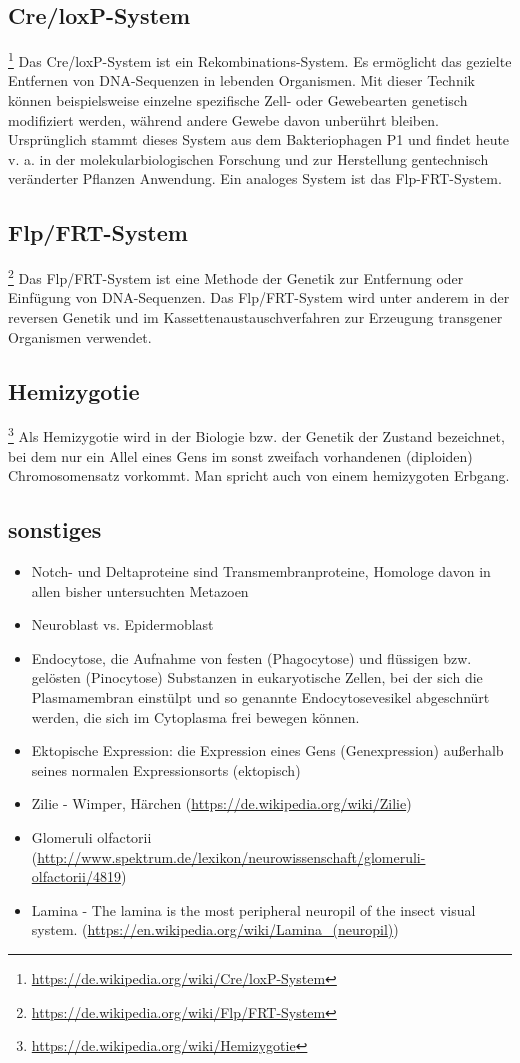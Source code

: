 \subsection{Cre/loxP-System}\footnote{\url{https://de.wikipedia.org/wiki/Cre/loxP-System}}
Das Cre/loxP-System ist ein Rekombinations-System. Es ermöglicht das gezielte Entfernen von DNA-Sequenzen in lebenden Organismen. Mit dieser Technik können beispielsweise einzelne spezifische Zell- oder Gewebearten genetisch modifiziert werden, während andere Gewebe davon unberührt bleiben. Ursprünglich stammt dieses System aus dem Bakteriophagen P1 und findet heute v. a. in der molekularbiologischen Forschung und zur Herstellung gentechnisch veränderter Pflanzen Anwendung. Ein analoges System ist das Flp-FRT-System.

\subsection{Flp/FRT-System}\footnote{\url{https://de.wikipedia.org/wiki/Flp/FRT-System}}
Das Flp/FRT-System ist eine Methode der Genetik zur Entfernung oder Einfügung von DNA-Sequenzen. Das Flp/FRT-System wird unter anderem in der reversen Genetik und im Kassettenaustauschverfahren zur Erzeugung transgener Organismen verwendet.

\subsection{Hemizygotie}\footnote{\url{https://de.wikipedia.org/wiki/Hemizygotie}}
Als Hemizygotie wird in der Biologie bzw. der Genetik der Zustand bezeichnet, bei dem nur ein Allel eines Gens im sonst zweifach vorhandenen (diploiden) Chromosomensatz vorkommt. Man spricht auch von einem hemizygoten Erbgang.

\subsection{sonstiges}
\begin{itemize}
	\item Notch- und Deltaproteine sind Transmembranproteine, Homologe davon in allen bisher untersuchten Metazoen 
	\item Neuroblast vs. Epidermoblast
	\item Endocytose, die Aufnahme von festen (Phagocytose) und flüssigen bzw. gelösten (Pinocytose) Substanzen in eukaryotische Zellen, bei der sich die Plasmamembran einstülpt und so genannte Endocytosevesikel abgeschnürt werden, die sich im Cytoplasma frei bewegen können.
	\item Ektopische Expression: die Expression eines Gens (Genexpression) außerhalb seines normalen Expressionsorts (ektopisch)
	\item Zilie - Wimper, Härchen (\url{https://de.wikipedia.org/wiki/Zilie})
	\item Glomeruli olfactorii (\url{http://www.spektrum.de/lexikon/neurowissenschaft/glomeruli-olfactorii/4819})
	\item Lamina - The lamina is the most peripheral neuropil of the insect visual system. (\url{https://en.wikipedia.org/wiki/Lamina_(neuropil)})
\end{itemize}